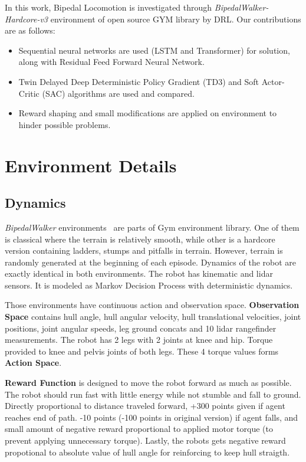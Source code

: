 \documentclass[a4paper, 12pt]{article} %
\begin{document}
In this work, Bipedal Locomotion is investigated through \textit{BipedalWalker-Hardcore-v3} \cite{noauthor_bipedalwalkerhardcore-v2_2021} environment of open source GYM library \cite{brockman_openai_2016} by DRL. 
Our contributions are as follows:
\begin{itemize}
	\item Sequential neural networks are used (LSTM and Transformer) for solution, along with Residual Feed Forward Neural Network.
	\item Twin Delayed Deep Deterministic Policy Gradient (TD3) and Soft Actor-Critic (SAC) algorithms are used and compared.
	\item Reward shaping and small modifications are applied on environment to hinder possible problems.
\end{itemize}

\section{Environment Details}

\subsection{Dynamics}

\textit{BipedalWalker} environments~\cite{noauthor_bipedalwalker-v2_2021, noauthor_bipedalwalkerhardcore-v2_2021} are parts of Gym environment library. 
One of them is classical where the terrain is relatively smooth, while other is a hardcore version containing ladders, stumps and pitfalls in terrain. 
However, terrain is randomly generated at the beginning of each episode.
Dynamics of the robot are exactly identical in both environments. 
The robot has kinematic and lidar sensors. 
It is modeled as Markov Decision Process with deterministic dynamics.

Those environments have continuous action and observation space. 
\textbf{Observation Space} contains hull angle, hull angular velocity, hull translational velocities, joint positions, joint angular speeds, leg ground concats and 10 lidar rangefinder measurements.
The robot has 2 legs with 2 joints at knee and hip. Torque provided to knee and pelvis joints of both legs. These 4 torque values forms  \textbf{Action Space}.

\textbf{Reward Function} is designed to move the robot forward as much as possible.
The robot should run fast with little energy while not stumble and fall to ground. 
Directly proportional to distance traveled forward, +300 points given if agent reaches end of path. 
-10 points (-100 points in original version) if agent falls, 
and small amount of negative reward proportional to applied motor torque (to prevent applying unnecessary torque). 
Lastly, the robots gets negative reward propotional to absolute value of hull angle for reinforcing to keep hull straigth. 
\end{document}
